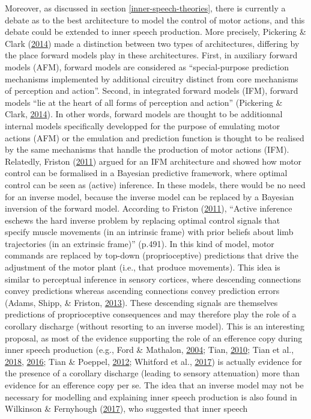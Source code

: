 \documentclass[a4paper,12pt,twoside,openright,oldfontcommands,final]{memoir}
\begin{document}
Moreover, as discussed in section \ref{inner-speech-theories}, there is currently a debate as to the best architecture to model the control of motor actions, and this debate could be extended to inner speech production. More precisely, Pickering \& Clark (\protect\hyperlink{ref-pickering_getting_2014}{2014}) made a distinction between two types of architectures, differing by the place forward models play in these architectures. First, in auxiliary forward models (AFM), forward models are considered as \enquote{special-purpose prediction mechanisms implemented by additional circuitry distinct from core mechanisms of perception and action}. Second, in integrated forward models (IFM), forward models \enquote{lie at the heart of all forms of perception and action} (Pickering \& Clark, \protect\hyperlink{ref-pickering_getting_2014}{2014}). In other words, forward models are thought to be additionnal internal models specifically developped for the purpose of emulating motor actions (AFM) or the emulation and prediction function is thought to be realised by the same mechanisms that handle the production of motor actions (IFM). Relatedly, Friston (\protect\hyperlink{ref-friston_what_2011}{2011}) argued for an IFM architecture and showed how motor control can be formalised in a Bayesian predictive framework, where optimal control can be seen as (active) inference. In these models, there would be no need for an inverse model, because the inverse model can be replaced by a Bayesian inversion of the forward model. According to Friston (\protect\hyperlink{ref-friston_what_2011}{2011}), \enquote{Active inference eschews the hard inverse problem by replacing optimal control signals that specify muscle movements (in an intrinsic frame) with prior beliefs about limb trajectories (in an extrinsic frame)} (p.491). In this kind of model, motor commands are replaced by top-down (proprioceptive) predictions that drive the adjustment of the motor plant (i.e., that produce movements). This idea is similar to perceptual inference in sensory cortices, where descending connections convey predictions whereas ascending connections convey prediction errors (Adams, Shipp, \& Friston, \protect\hyperlink{ref-adams_predictions_2013}{2013}). These descending signals are themselves predictions of proprioceptive consequences and may therefore play the role of a corollary discharge (without resorting to an inverse model). This is an interesting proposal, as most of the evidence supporting the role of an efference copy during inner speech production (e.g., Ford \& Mathalon, \protect\hyperlink{ref-ford_electrophysiological_2004}{2004}; Tian, \protect\hyperlink{ref-tian_mental_2010}{2010}; Tian et al., \protect\hyperlink{ref-tian_imagined_2018}{2018}, \protect\hyperlink{ref-tian_mental_2016}{2016}; Tian \& Poeppel, \protect\hyperlink{ref-tian_mental_2012}{2012}; Whitford et al., \protect\hyperlink{ref-whitford_neurophysiological_2017}{2017}) is actually evidence for the presence of a corollary discharge (leading to sensory attenuation) more than evidence for an efference copy per se. The idea that an inverse model may not be necessary for modelling and explaining inner speech production is also found in Wilkinson \& Fernyhough (\protect\hyperlink{ref-wilkinson_auditory_2017}{2017}), who suggested that inner speech 
\end{document}
